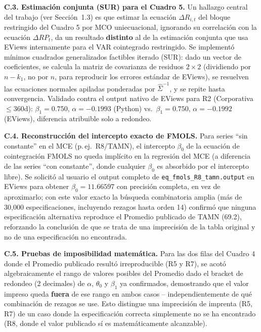 \documentclass[12pt, letterpaper]{article}
\begin{document}
\textbf{C.3. Estimación conjunta (SUR) para el Cuadro 5.} Un hallazgo
central del trabajo (ver Sección~1.3) es que estimar la ecuación
$\Delta R_{i,t}$ del bloque restringido del Cuadro 5 por MCO
uniecuacional, ignorando su correlación con la ecuación
$\Delta RP_t$, da un resultado \textbf{distinto} al de la estimación
conjunta que usa EViews internamente para el VAR cointegrado
restringido. Se implementó mínimos cuadrados generalizados factibles
iterado (SUR): dado un vector de coeficientes, se calcula la matriz de
covarianza de residuos $2\times2$ (dividiendo por $n-k_1$, no por
$n$, para reproducir los errores estándar de EViews), se resuelven las
ecuaciones normales apiladas ponderadas por $\hat\Sigma^{-1}$, y se
repite hasta convergencia. Validado contra el output nativo de EViews
para R2 (Corporativa $\le$360d): $\beta_1=0.750$, $\alpha=-0.1993$
(Python) vs.\ $\beta_1=0.750$, $\alpha=-0.1992$ (EViews), diferencia
atribuible solo a redondeo.

\textbf{C.4. Reconstrucción del intercepto exacto de FMOLS.} Para
series ``sin constante'' en el MCE (p.\,ej.\ R8/TAMN), el intercepto
$\beta_0$ de la ecuación de cointegración FMOLS no queda implícito en
la regresión del MCE (a diferencia de las series ``con constante'',
donde cualquier $\beta_0$ es absorbido por el intercepto libre). Se
solicitó al usuario el output completo de \lstinline{eq_fmols_R8_tamn.output}
en EViews para obtener $\beta_0=11.66597$ con precisión completa, en
vez de aproximarlo; con este valor exacto la búsqueda combinatoria
amplia (más de 30,000 especificaciones, incluyendo rezagos hasta orden
14) confirmó que ninguna especificación alternativa reproduce el
Promedio publicado de TAMN (69.2), reforzando la conclusión de que se
trata de una imprecisión de la tabla original y no de una
especificación no encontrada.

\textbf{C.5. Pruebas de imposibilidad matemática.} Para las dos filas
del Cuadro 4 donde el Promedio publicado resultó irreproducible (R5 y
R7), se acotó algebraicamente el rango de valores posibles del
Promedio dado el bracket de redondeo (2 decimales) de $\alpha$,
$\theta_0$ y $\beta_1$ ya confirmados, demostrando que el valor
impreso queda \textbf{fuera} de ese rango en ambos casos --
independientemente de qué combinación de rezagos se use. Esto
distingue una imprecisión de imprenta (R5, R7) de un caso donde la
especificación correcta simplemente no se ha encontrado (R8, donde el
valor publicado sí es matemáticamente alcanzable).
\end{document}
